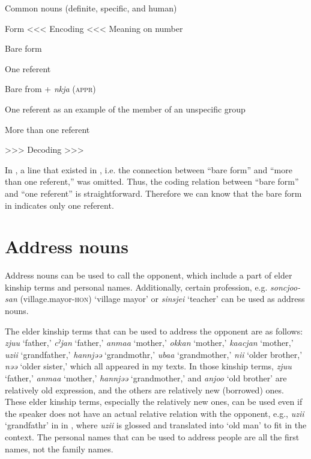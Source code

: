 \begin{table}
\caption{\label{tab:key:46} Common nouns (definite, specific, and human)}

Form  <<< Encoding <<<  Meaning on number

\ea
Bare form  %

\ea \label{ex:7:a}One referent

Bare from + \textit{nkja} (\textsc{appr})  %


\ex \label{ex:7:b}One referent as an example of the member of an unspecific group

  \ex \label{ex:7:c}More than one referent

  >>> Decoding >>>
  \z
\z
{}
\end{table}
In , a line that existed in , i.e. the connection between “bare form” and “more than one referent,” was omitted. Thus, the coding relation between “bare form” and “one referent” is straightforward. Therefore we can know that the bare form in  indicates only one referent.

\section{Address nouns}

Address nouns can be used to call the opponent, which include a part of elder kinship terms and personal names. Additionally, certain profession, e.g. \textit{soncjoo-san} (village.mayor-\textsc{hon}) ‘village mayor’ or \textit{sinsjei} ‘teacher’ can be used as address nouns.

The elder kinship terms that can be used to address the opponent are as follows: \textit{zjuu} ‘father,’ \textit{cˀjan} ‘father,’ \textit{anmaa} ‘mother,’ \textit{okkan} ‘mother,’ \textit{kaacjan} ‘mother,’ \textit{uzii} ‘grandfather,’ \textit{hannjəə} ‘grandmothr,’ \textit{ubaa} ‘grandmother,’ \textit{nii} ‘older brother,’ \textit{nəə} ‘older sister,’ which all appeared in my texts. In those kinship terms, \textit{zjuu} ‘father,’ \textit{anmaa} ‘mother,’ \textit{hannjəə} ‘grandmother,’ and \textit{anjoo} ‘old brother’ are relatively old expression, and the others are relatively new (borrowed) ones. These elder kinship terms, especially the relatively new ones, can be used even if the speaker does not have an actual relative relation with the opponent, e.g., \textit{uzii} ‘grandfathr’ in  in , where \textit{uzii} is glossed and translated into ‘old man’ to fit in the context. The personal names that can be used to address people are all the first names, not the family names.

